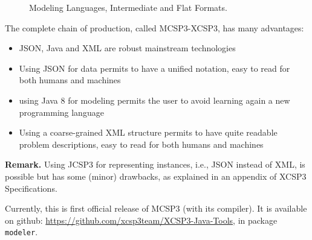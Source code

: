 \documentclass[10pt]{article}
\begin{document}
\begin{figure}[p]
\begin{center}
\end{center}
\caption{Modeling Languages, Intermediate and Flat Formats.\label{fig:modfor}}
 \end{figure}



\noindent The complete chain of production, called MCSP3-XCSP3, has many advantages:
\begin{itemize}
\item JSON, Java and XML are robust mainstream technologies
\item Using JSON for data permits to have a unified notation, easy to read for both humans and machines
\item using Java 8 for modeling permits the user to avoid learning again a new programming language
\item Using a coarse-grained XML structure permits to have quite readable problem descriptions, easy to read for both humans and machines
\end{itemize}

{\bf Remark.} Using JCSP3 for representing instances, i.e., JSON instead of XML, is possible but has some (minor) drawbacks, as explained in an appendix of XCSP3 Specifications. 

\bigskip
Currently, this is first official release of MCSP3 (with its compiler).
It is available on github: \href{https://github.com/xcsp3team/XCSP3-Java-Tools}{https://github.com/xcsp3team/XCSP3-Java-Tools}, in package \texttt{modeler}.
    
\end{document}
